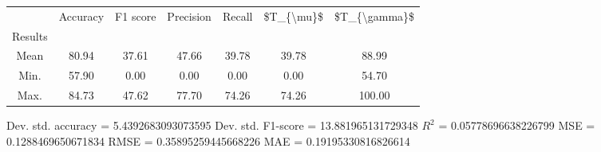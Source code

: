 \begin{tabular}{|c|c|c|c|c|c|c|}
\toprule
{} &  Accuracy &  F1 score &  Precision &  Recall &  \$T\_\{\textbackslash mu\}\$ &  \$T\_\{\textbackslash gamma\}\$ \\
Results &           &           &            &         &            &               \\
\hline
Mean    &     80.94 &     37.61 &      47.66 &   39.78 &      39.78 &         88.99 \\
Min.    &     57.90 &      0.00 &       0.00 &    0.00 &       0.00 &         54.70 \\
Max.    &     84.73 &     47.62 &      77.70 &   74.26 &      74.26 &        100.00 \\
\bottomrule
\end{tabular}

 Dev. std. accuracy = 5.4392683093073595
 Dev. std. F1-score = 13.881965131729348
 $R^2$ = 0.05778696638226799
 MSE = 0.1288469650671834
 RMSE = 0.35895259445668226
 MAE = 0.19195330816826614
